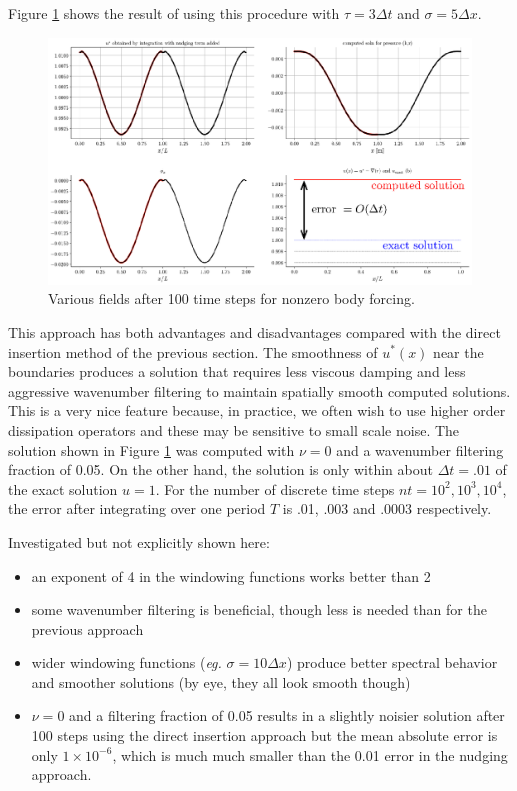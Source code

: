 \documentclass{jfm}
\begin{document}
Figure \ref{fig:composite2} shows the result of using this procedure with $\tau=3\Delta t$ and $\sigma=5 \Delta x$.
 \begin{figure}
  \centerline{\includegraphics[width=1.0\textwidth]{FIGS/nudging100steps/composite.eps}}
  \caption{Various fields after 100 time steps for nonzero body forcing.}
  \label{fig:composite2}
\end{figure}
This approach has both advantages and disadvantages compared with the direct insertion method of the previous section. The smoothness of $u^*(x)$ near the boundaries produces a solution that requires less viscous damping
and less aggressive wavenumber filtering to maintain spatially smooth computed solutions. This is a very nice feature because, in practice, we often wish to use higher order dissipation operators and these may be sensitive to
small scale noise. The solution shown in Figure \ref{fig:composite2} was computed with $\nu=0$ and a wavenumber filtering fraction of 0.05. On the other hand, the solution is only within about $\Delta t=.01$ of the exact solution $u=1$.
For the number of discrete time steps $nt=10^2,10^3,10^4$, the error after integrating over one period $T$ is .01, .003 and .0003 respectively.

Investigated but not explicitly shown here: \begin{itemize}
\item an exponent of 4 in the windowing functions works better than 2
\item some wavenumber filtering is beneficial, though less is needed than for the previous approach
\item wider windowing functions ({\em eg.} $\sigma=10 \Delta x$) produce better spectral behavior and smoother solutions (by eye, they all look smooth though)
\item $\nu=0$ and a filtering fraction of 0.05 results in a slightly noisier solution after 100 steps using the direct insertion approach but the mean absolute error is only $1 \times 10^{-6}$, which is much much smaller than the 0.01 error in the nudging approach.
\end{itemize}




\end{document}
